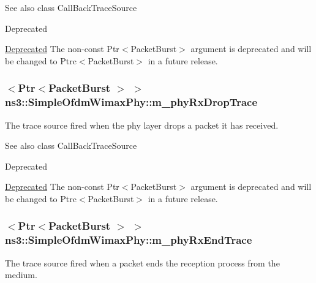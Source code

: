 \begin{DoxySeeAlso}{See also}
class Call\+Back\+Trace\+Source 
\end{DoxySeeAlso}
\begin{DoxyRefDesc}{Deprecated}
\item[\hyperlink{deprecated__deprecated000040}{Deprecated}]The non-\/const {\ttfamily Ptr$<$\+Packet\+Burst$>$} argument is deprecated and will be changed to {\ttfamily Ptrc$<$\+Packet\+Burst$>$} in a future release. \end{DoxyRefDesc}
\subsubsection[{\texorpdfstring{m\+\_\+phy\+Rx\+Drop\+Trace}{m_phyRxDropTrace}}]{$<${\bf Ptr}$<${\bf Packet\+Burst} $>$ $>$ ns3\+::\+Simple\+Ofdm\+Wimax\+Phy\+::m\+\_\+phy\+Rx\+Drop\+Trace\hspace{0.3cm}{\ttfamily [private]}}\hypertarget{classns3_1_1SimpleOfdmWimaxPhy_a0dc52213d50436ee17875d8fee2671ce}{}\label{classns3_1_1SimpleOfdmWimaxPhy_a0dc52213d50436ee17875d8fee2671ce}
The trace source fired when the phy layer drops a packet it has received.

\begin{DoxySeeAlso}{See also}
class Call\+Back\+Trace\+Source 
\end{DoxySeeAlso}
\begin{DoxyRefDesc}{Deprecated}
\item[\hyperlink{deprecated__deprecated000042}{Deprecated}]The non-\/const {\ttfamily Ptr$<$\+Packet\+Burst$>$} argument is deprecated and will be changed to {\ttfamily Ptrc$<$\+Packet\+Burst$>$} in a future release. \end{DoxyRefDesc}
\subsubsection[{\texorpdfstring{m\+\_\+phy\+Rx\+End\+Trace}{m_phyRxEndTrace}}]{$<${\bf Ptr}$<${\bf Packet\+Burst} $>$ $>$ ns3\+::\+Simple\+Ofdm\+Wimax\+Phy\+::m\+\_\+phy\+Rx\+End\+Trace\hspace{0.3cm}{\ttfamily [private]}}\hypertarget{classns3_1_1SimpleOfdmWimaxPhy_a02734dac1757daecf21e5c53fced860e}{}\label{classns3_1_1SimpleOfdmWimaxPhy_a02734dac1757daecf21e5c53fced860e}
The trace source fired when a packet ends the reception process from the medium.

